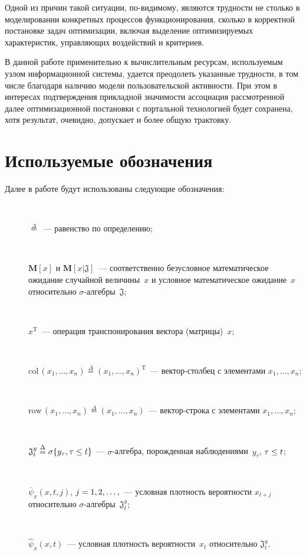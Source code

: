 \begin{multicols}{2}
  Одной из причин такой ситуации, по-видимому, являются трудности не столько в 
моделировании конкретных процессов функционирования, сколько в корректной постановке 
задач оптимизации, включая выделение оптимизируемых характеристик, управляющих 
воздействий и критериев.
  
  В данной работе применительно к вычислительным ресурсам, используемым узлом 
информационной системы, удается преодолеть указанные трудности, в том чис\-ле благодаря 
наличию модели пользовательской активности. При этом в интересах подтверждения 
прикладной значимости ассоциация рассмотренной далее оптимизационной постановки с 
портальной технологией будет сохранена, хотя результат, очевидно, допускает и более 
общую трактовку.

\section{Используемые обозначения}
  
  Далее в работе будут использованы следующие обозначения:
  \begin{description}
  \item[\,] $\overset{\Delta}{=}$~--- равенство по определению;
\item[\,] $\mathbf{M}[x]$ и $\mathbf{M}[x\vert \mathfrak{J}]$~--- соответственно безусловное 
математическое ожидание случайной величины~$x$ и условное математическое 
ожидание~$x$ относительно $\sigma$-ал\-геб\-ры~$\mathfrak{J}$;
\item[\,] $x^{\mathrm{T}}$~--- операция транспонирования вектора (мат\-ри\-цы)~$x$;
\item[\,] $\mathrm{col}\,(x_1,\ldots ,x_n)\overset{\Delta}{=}(x_1,\ldots ,x_n)^{\mathrm{T}}$~--- век\-тор-стол\-бец с 
элементами $x_1,\ldots ,x_n$;
\item[\,] $\mathrm{row}\,(x_1,\ldots ,x_n) \overset{\Delta}{=}(x_1,\ldots ,x_n)$~--- век\-тор-стро\-ка с 
элементами  $x_1,\ldots ,x_n$;
\item[\,] $\mathfrak{J}_t^{y}\overset{\Delta}{=}\sigma\{y_\tau,\tau\hm\leq t\}$~--- 
$\sigma$-ал\-геб\-ра, порожденная наблюдениями~$y_\tau$, $\tau\hm\leq t$;
\item[\,] $\overline{\psi}_x(x,t,j)$, $j\hm=1, 2,\ldots ,$~--- условная плот\-ность вероятности 
$x_{t+j}$ относительно $\sigma$-ал\-геб\-ры~$\mathfrak{J}_t^y$;
\item[\,] $\hat{\psi}_x(x,t)$~--- условная плотность вероятности~$x_t$ относительно 
$\mathfrak{J}_t^y$.
\end{description}


\end{multicols}
